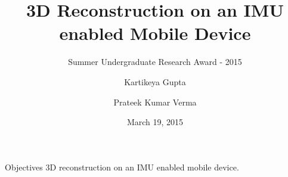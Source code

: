 \documentclass{beamer}
\title[3D reconstruction]{3D Reconstruction on an IMU enabled Mobile Device}
\subtitle{Summer Undergraduate Research Award - 2015}
\author[Kartikeya \and Prateek]{Kartikeya Gupta \and Prateek Kumar Verma}
\institute[IITD] %
{
  Department of Computer Science and Engineering\\
  IIT Delhi
  \and
  Under supervision of \\
  \textbf{Prof. Subhashis Banerjee} \\
  Department of Computer Science and Engineering
}
\date{March 19, 2015}
\begin{document}
\begin{frame}
  \titlepage
\end{frame}




\begin{frame}{Objectives}{}
  3D reconstruction on an IMU enabled mobile device.
\end{frame}
\end{document}
